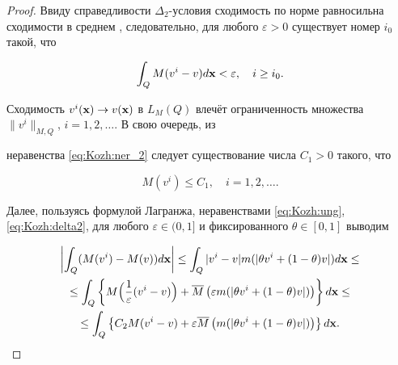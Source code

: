\begin{proof} Ввиду справедливости $\Delta_2$-условия сходимость по норме равносильна сходимости в среднем \cite[гл. II, \S~9, теорема 9.4]{KozhKhad:bib:Rut}, следовательно, для любого $\varepsilon>0$ существует номер $i_0$ такой, что

\begin{equation}\label{eq:Kozh:lem_1(1)}

\int_Q M(v^i-v)d{\bf x}< \varepsilon,\quad i\geq i_0.

\end{equation}

 Сходимость $v^i({\bf x}) \to  v({\bf x})$ в $L_M(Q)$  влечёт ограниченность множества $\|v^i\|_{M,Q}$, $i=1, 2,\ldots$. В свою очередь, из

неравенства  \eqref{eq:Kozh:ner_2} следует существование числа $C_1>0$ такого, что

\begin{equation}\label{eq:Kozh:lem_1(2)}

M(v^i)\leq C_1,\quad i=1, 2,\ldots.

\end{equation}







Далее, пользуясь формулой Лагранжа, неравенствами \eqref{eq:Kozh:ung}, \eqref{eq:Kozh:delta2}, для любого $\varepsilon\in (0, 1]$ и  фиксированного $\theta\in [0, 1]$ выводим

\begin{multline}\label{eq:Kozh:lem_1(3)}

\left|\int_Q

(M(v^i)-M(v)) d{\bf x}\right|\le\int_Q |v^i-v|m(|\theta v^i+(1-\theta)v|)

d{\bf x}\leq

\\

\le\int_Q \left\{M\Bigl(\frac{1}{\varepsilon}(v^i-v)\Bigr)+\overline{M}\left(\varepsilon

m(|\theta v^i+(1-\theta)v|)\right)\right\} d{\bf x}\leq

\\

\leq \int_Q \left\{

C_2M(v^i-v)+\varepsilon\overline{M}\left(

m(|\theta v^i+(1-\theta)v|)\right)\right\} d{\bf x}.

\end{multline}


\end{proof}
